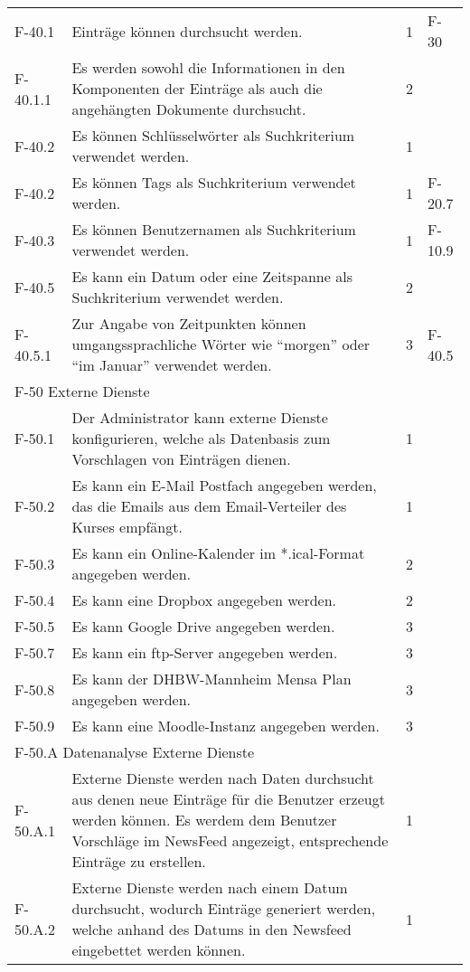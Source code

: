 \begin{tabularx}{\textwidth}{|l|X|l|l|}
    \hline
    F-40.1 & Einträge können durchsucht werden. & 1 & F-30\\
    F-40.1.1 & Es werden sowohl die Informationen in den Komponenten der Einträge als auch die angehängten Dokumente durchsucht. & 2 & \\
    F-40.2 & Es können Schlüsselwörter als Suchkriterium verwendet werden. & 1 &\\
    F-40.2 & Es können Tags als Suchkriterium verwendet werden. & 1 & F-20.7\\
    F-40.3 & Es können Benutzernamen als Suchkriterium verwendet werden. & 1 & F-10.9\\
    F-40.5 & Es kann ein Datum oder eine Zeitspanne als Suchkriterium verwendet werden. & 2 & \\
    F-40.5.1 & Zur Angabe von Zeitpunkten können umgangssprachliche Wörter wie \enquote{morgen} oder \enquote{im Januar} verwendet werden. & 3 & F-40.5\\
    \hline
    \multicolumn{4}{|l|}{F-50 Externe Dienste}\\
    \hline
    F-50.1 & Der Administrator kann externe Dienste konfigurieren, welche als Datenbasis zum Vorschlagen von Einträgen dienen. & 1 & \\
    F-50.2 & Es kann ein E-Mail Postfach angegeben werden, das die Emails aus dem Email-Verteiler des Kurses empfängt. & 1 & \\
    F-50.3 & Es kann ein Online-Kalender im *.ical-Format angegeben werden. & 2 & \\
    F-50.4 & Es kann eine Dropbox angegeben werden. & 2 & \\
    F-50.5 & Es kann Google Drive angegeben werden. & 3 & \\
    F-50.7 & Es kann ein ftp-Server angegeben werden. & 3 & \\
    F-50.8 & Es kann der DHBW-Mannheim Mensa Plan angegeben werden. & 3 & \\
    F-50.9 & Es kann eine Moodle-Instanz angegeben werden.&3&\\
    \hline
    \multicolumn{4}{|l|}{F-50.A Datenanalyse Externe Dienste}\\
    \hline
    F-50.A.1 & Externe Dienste werden nach Daten durchsucht aus denen neue Einträge für die Benutzer erzeugt werden können. Es werdem dem Benutzer Vorschläge im NewsFeed angezeigt, entsprechende Einträge zu erstellen. & 1 & \\
    F-50.A.2 & Externe Dienste werden nach einem Datum durchsucht, wodurch Einträge generiert werden, welche anhand des Datums in den Newsfeed eingebettet werden können. & 1 & \\

\end{tabularx}

